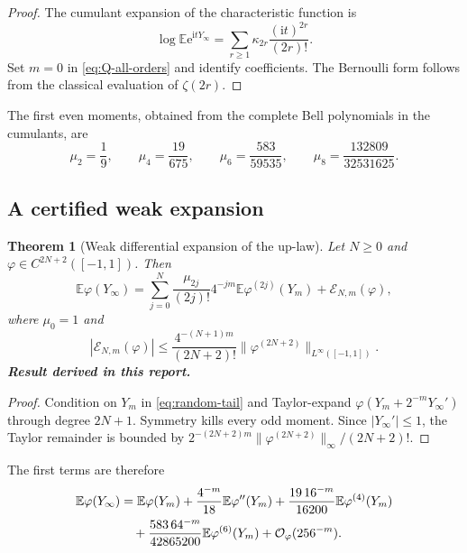 \documentclass[11pt,oneside]{article}
\numberwithin{equation}{section}
\newtheorem{theorem}{Theorem}[section]
\theoremstyle{definition}
\theoremstyle{remark}
\newcommand{\E}{\mathbb E}
\newcommand{\e}{\mathrm e}
\newcommand{\ii}{\mathrm i}
\newcommand{\bigO}{\mathcal O}
\newcommand{\newresult}{\textbf{Result derived in this report.}}
\begin{document}
\begin{proof}
The cumulant expansion of the characteristic function is
\[
 \log\E\e^{\ii tY_\infty}
 =\sum_{r\ge1}\kappa_{2r}\frac{(\ii t)^{2r}}{(2r)!}.
\]
Set $m=0$ in \eqref{eq:Q-all-orders} and identify coefficients.  The Bernoulli form follows
from the classical evaluation of $\zeta(2r)$.
\end{proof}

The first even moments, obtained from the complete Bell polynomials in the cumulants, are
\begin{equation}
 \mu_2=\frac19,\qquad
 \mu_4=\frac{19}{675},\qquad
 \mu_6=\frac{583}{59535},\qquad
 \mu_8=\frac{132809}{32531625}.
 \label{eq:moments-first}
\end{equation}

\subsection{A certified weak expansion}

\begin{theorem}[Weak differential expansion of the up-law]
\label{thm:weak-expansion}
Let $N\ge0$ and $\varphi\in C^{2N+2}([-1,1])$.  Then
\begin{equation}
 \boxed{
 \E\varphi(Y_\infty)
 =\sum_{j=0}^{N}\frac{\mu_{2j}}{(2j)!}4^{-jm}
   \E\varphi^{(2j)}(Y_m)+\mathcal E_{N,m}(\varphi),}
 \label{eq:weak-expansion}
\end{equation}
where $\mu_0=1$ and
\begin{equation}
 \boxed{
 |\mathcal E_{N,m}(\varphi)|
 \le\frac{4^{-(N+1)m}}{(2N+2)!}
 \|\varphi^{(2N+2)}\|_{L^\infty([-1,1])}.}
 \label{eq:weak-bound}
\end{equation}
\newresult
\end{theorem}

\begin{proof}
Condition on $Y_m$ in \eqref{eq:random-tail} and Taylor-expand
$\varphi(Y_m+2^{-m}Y_\infty')$ through degree $2N+1$.  Symmetry kills every odd moment.
Since $|Y_\infty'|\le1$, the Taylor remainder is bounded by
$2^{-(2N+2)m}\|\varphi^{(2N+2)}\|_\infty/(2N+2)!$.
\end{proof}

The first terms are therefore
\begin{align}
 \E\varphi(Y_\infty)
 &=\E\varphi(Y_m)
 +\frac{4^{-m}}{18}\E\varphi''(Y_m)
 +\frac{19\,16^{-m}}{16200}\E\varphi^{(4)}(Y_m)
 \notag\\
 &\quad
 +\frac{583\,64^{-m}}{42865200}\E\varphi^{(6)}(Y_m)
 +\bigO_\varphi(256^{-m}).
 \label{eq:weak-first}
\end{align}
\end{document}

